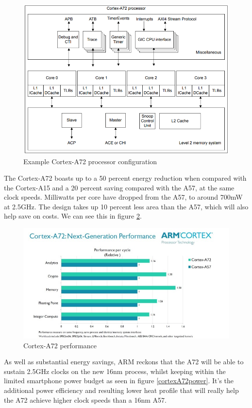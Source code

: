 \documentclass[12pt]{article}
\begin{document}
\begin{figure}[H]
\begin{center}
\includegraphics[width=0.8\linewidth]{imgs/foto1.png}
\caption{Example Cortex-A72 processor configuration}
\label{cortexA72conf}
\end{center}
\end{figure}

The Cortex-A72 boasts up to a 50 percent energy reduction when compared with the Cortex-A15 and a 20 percent saving compared with the A57, at the same clock speeds. Milliwatts per core have dropped from the A57, to around 700mW at 2.5GHz.\cite{androidauthority} The design takes up 10 percent less area than the A57, which will also help save on costs. We can see this in figure \ref{cortexA72performance}.

\begin{figure}[H]
\begin{center}
\includegraphics[width=0.8\linewidth]{imgs/foto2.jpg}
\caption{Cortex-A72 performance}
\label{cortexA72performance}
\end{center}
\end{figure}

As well as substantial energy savings, ARM reckons that the A72 will be able to sustain 2.5GHz clocks on the new 16nm process, whilst keeping within the limited smartphone power budget as seen in figure \ref{cortexA72power}. It’s the additional power efficiency and resulting lower heat profile that will really help the A72 achieve higher clock speeds than a 16nm A57.\cite{androidauthority}
\end{document}
